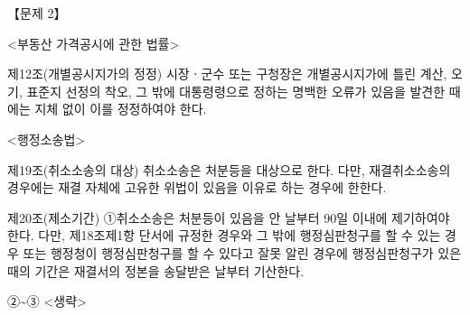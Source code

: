 \begin{longquestion}{【문제 2】}
\begin{framedtext}
<부동산 가격공시에 관한 법률> \par
제12조(개별공시지가의 정정) 시장ㆍ군수 또는 구청장은 개별공시지가에 틀린 계산, 오기, 표준지 선정의 착오, 그 밖에 대통령령으로 정하는 명백한 오류가 있음을 발견한 때에는 지체 없이 이를 정정하여야 한다. \par
<행정소송법> \par
제19조(취소소송의 대상) 취소소송은 처분등을 대상으로 한다. 다만, 재결취소소송의 경우에는 재결 자체에 고유한 위법이 있음을 이유로 하는 경우에 한한다. \par
제20조(제소기간) ①취소소송은 처분등이 있음을 안 날부터 90일 이내에 제기하여야 한다. 다만, 제18조제1항 단서에 규정한 경우와 그 밖에 행정심판청구를 할 수 있는 경우 또는 행정청이 행정심판청구를 할 수 있다고 잘못 알린 경우에 행정심판청구가 있은 때의 기간은 재결서의 정본을 송달받은 날부터 기산한다. \par
②\textasciitilde{}③ <생략> \par
\end{framedtext}
\end{longquestion}
